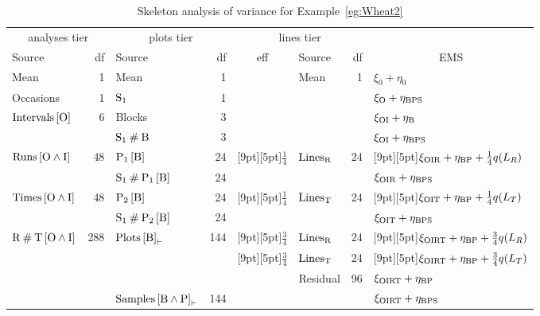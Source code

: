 \clearpage
\begin{table}
\caption{\label{tab:ANOVAWheat2}Skeleton analysis of variance for
Example~\ref{eg:Wheat2}}
\begin{center}
\begin{tabular}{lr|lr|clr|l}
\multicolumn{2}{c|}{analyses tier} & \multicolumn{2}{c|}{plots tier} &
\multicolumn{3}{c|}{lines tier} & \\
Source & df & Source & df & eff &Source & df & \multicolumn{1}{c}{EMS} \\
\hline
Mean & 1 & Mean & 1 & & Mean & 1 & $\xi_0 + \eta_0$ \\
\hline
    Occasions & 1 & $\mathrm{S}_1$ & 1 &  & & & $\xi_\mathrm{O} + \eta_\mathrm{BPS}$ \\
\hline
    $\mathrm{Intervals}\left[\mathrm{O}\right]$ & 6 & Blocks & 3 &  & & &
                                                  $\xi_\mathrm{OI} + \eta_\mathrm{B}$ \\
\cline{3-8} & &  $\mathrm{S}_1\mathbin{\#}\mathrm{B}$ & 3 & & & &
                                                  $\xi_\mathrm{OI} + \eta_\mathrm{BPS}$ \\
\hline $\mathrm{Runs} \left[\mathrm{O}\wedge\mathrm{I}\right]$ & 48 &
       $\mathrm{P}_1 \left[\mathrm{B}\right]$ &  24
        &\raisebox{8.5pt}[9pt][5pt]{}$\frac{1}{4}$ & $\mathrm{Lines}_{\mathrm{R}}$  & 24
        &\raisebox{8.5pt}[9pt][5pt]{}$\xi_\mathrm{OIR} + \eta_\mathrm{BP} + \frac{1}{4}q(L_R)$ \\
\cline{3-8}
& &  $\mathrm{S}_1\mathbin{\#}\mathrm{P}_1\left[\mathrm{B}\right]$ & 24 & & & &
                                                  $\xi_\mathrm{OIR} + \eta_\mathrm{BPS}$ \\
\hline
$\mathrm{Times}\left[\mathrm{O}\wedge\mathrm{I}\right]$ & 48 &
       $\mathrm{P}_2 \left[\mathrm{B}\right]$ &  24
        &\raisebox{8.5pt}[9pt][5pt]{}$\frac{1}{4}$ & $\mathrm{Lines}_{\mathrm{T}}$ & 24
        &\raisebox{8.5pt}[9pt][5pt]{}$\xi_\mathrm{OIT} + \eta_\mathrm{BP} + \frac{1}{4}q(L_T)$\\
\cline{3-8}
 & &  $\mathrm{S}_1\mathbin{\#}\mathrm{P}_2\left[\mathrm{B}\right]$ & 24 & & & &
                                                  $\xi_\mathrm{OIT} + \eta_\mathrm{BPS}$ \\
\hline
$\mathrm{R}\mathbin{\#}\mathrm{T}\left[\mathrm{O}\wedge\mathrm{I}\right]$ & 288 &
       $\mathrm{Plots}\left[\mathrm{B}\right]_{\mathbin{\vdash}}$ &  144
        &\raisebox{8.5pt}[9pt][5pt]{}$\frac{3}{4}$ & $\mathrm{Lines}_{\mathrm{R}}$ & 24
        &\raisebox{8.5pt}[9pt][5pt]{}$\xi_\mathrm{OIRT} + \eta_\mathrm{BP} + \frac{3}{4}q(L_R)$ \\
\cline{5-8}
& & & &\raisebox{8.5pt}[9pt][5pt]{}$\frac{3}{4}$ &
        $\mathrm{Lines}_{\mathrm{T}}$ & 24 &
         \raisebox{8.5pt}[9pt][5pt]{}$\xi_\mathrm{OIRT} + \eta_\mathrm{BP} + \frac{3}{4} q(L_T)$\\
\cline{5-8}
& & & & & Residual  & 96 & $\xi_\mathrm{OIRT} + \eta_\mathrm{BP}$  \\
\cline{3-8} & &
$\mathrm{Samples}\left[\mathrm{B}\wedge\mathrm{P}\right]_{\mathbin{\vdash}}$
              & 144 & & & & $\xi_\mathrm{OIRT} + \eta_\mathrm{BPS}$ \\
\hline
\end{tabular}
\end{center}
\end{table}
